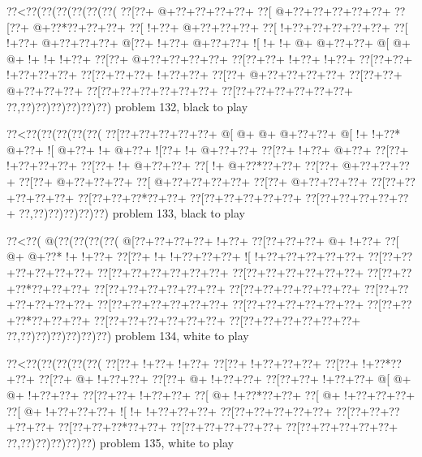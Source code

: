 \vbox{\vbox{\goo
\0??<\0??(\0??(\0??(\0??(\0??(\0??(
\0??[\0??+\- @+\0??+\0??+\0??+\0??+
\0??[\- @+\0??+\0??+\0??+\0??+\0??+
\0??[\0??+\- @+\0??*\0??+\0??+\0??+
\0??[\- !+\0??+\- @+\0??+\0??+\0??+
\0??[\- !+\0??+\0??+\0??+\0??+\0??+
\0??[\- !+\0??+\- @+\0??+\0??+\0??+
\- @[\0??+\- !+\0??+\- @+\0??+\0??+
\- ![\- !+\- !+\- @+\- @+\0??+\0??+
\- @[\- @+\- @+\- !+\- !+\- !+\0??+
\0??[\0??+\- @+\0??+\0??+\0??+\0??+
\0??[\0??+\0??+\- !+\0??+\- !+\0??+
\0??[\0??+\0??+\- !+\0??+\0??+\0??+
\0??[\0??+\0??+\0??+\- !+\0??+\0??+
\0??[\0??+\- @+\0??+\0??+\0??+\0??+
\0??[\0??+\0??+\- @+\0??+\0??+\0??+
\0??[\0??+\0??+\0??+\0??+\0??+\0??+
\0??[\0??+\0??+\0??+\0??+\0??+\0??+
\0??,\0??)\0??)\0??)\0??)\0??)\0??)
}
\hfil problem 132, black to play\hfil\break
}

\vbox{\vbox{\goo
\0??<\0??(\0??(\0??(\0??(\0??(
\0??[\0??+\0??+\0??+\0??+\0??+
\- @[\- @+\- @+\- @+\0??+\0??+
\- @[\- !+\- !+\0??*\- @+\0??+
\- ![\- @+\0??+\- !+\- @+\0??+
\- ![\0??+\- !+\- @+\0??+\0??+
\0??[\0??+\- !+\0??+\- @+\0??+
\0??[\0??+\- !+\0??+\0??+\0??+
\0??[\0??+\- !+\- @+\0??+\0??+
\0??[\- !+\- @+\0??*\0??+\0??+
\0??[\0??+\- @+\0??+\0??+\0??+
\0??[\0??+\- @+\0??+\0??+\0??+
\0??[\- @+\0??+\0??+\0??+\0??+
\0??[\0??+\- @+\0??+\0??+\0??+
\0??[\0??+\0??+\0??+\0??+\0??+
\0??[\0??+\0??+\0??*\0??+\0??+
\0??[\0??+\0??+\0??+\0??+\0??+
\0??[\0??+\0??+\0??+\0??+\0??+
\0??,\0??)\0??)\0??)\0??)\0??)
}
\hfil problem 133, black to play\hfil\break
}

\vbox{\vbox{\goo
\0??<\0??(\- @(\0??(\0??(\0??(\0??(
\- @[\0??+\0??+\0??+\0??+\- !+\0??+
\0??[\0??+\0??+\0??+\- @+\- !+\0??+
\0??[\- @+\- @+\0??*\- !+\- !+\0??+
\0??[\0??+\- !+\- !+\0??+\0??+\0??+
\- ![\- !+\0??+\0??+\0??+\0??+\0??+
\0??[\0??+\0??+\0??+\0??+\0??+\0??+
\0??[\0??+\0??+\0??+\0??+\0??+\0??+
\0??[\0??+\0??+\0??+\0??+\0??+\0??+
\0??[\0??+\0??+\0??*\0??+\0??+\0??+
\0??[\0??+\0??+\0??+\0??+\0??+\0??+
\0??[\0??+\0??+\0??+\0??+\0??+\0??+
\0??[\0??+\0??+\0??+\0??+\0??+\0??+
\0??[\0??+\0??+\0??+\0??+\0??+\0??+
\0??[\0??+\0??+\0??+\0??+\0??+\0??+
\0??[\0??+\0??+\0??*\0??+\0??+\0??+
\0??[\0??+\0??+\0??+\0??+\0??+\0??+
\0??[\0??+\0??+\0??+\0??+\0??+\0??+
\0??,\0??)\0??)\0??)\0??)\0??)\0??)
}
\hfil problem 134, white to play\hfil\break
}

\vbox{\vbox{\goo
\0??<\0??(\0??(\0??(\0??(\0??(
\0??[\0??+\- !+\0??+\- !+\0??+
\0??[\0??+\- !+\0??+\0??+\0??+
\0??[\0??+\- !+\0??*\0??+\0??+
\0??[\0??+\- @+\- !+\0??+\0??+
\0??[\0??+\- @+\- !+\0??+\0??+
\0??[\0??+\0??+\- !+\0??+\0??+
\- @[\- @+\- @+\- !+\0??+\0??+
\0??[\0??+\0??+\- !+\0??+\0??+
\0??[\- @+\- !+\0??*\0??+\0??+
\0??[\- @+\- !+\0??+\0??+\0??+
\0??[\- @+\- !+\0??+\0??+\0??+
\- ![\- !+\- !+\0??+\0??+\0??+
\0??[\0??+\0??+\0??+\0??+\0??+
\0??[\0??+\0??+\0??+\0??+\0??+
\0??[\0??+\0??+\0??*\0??+\0??+
\0??[\0??+\0??+\0??+\0??+\0??+
\0??[\0??+\0??+\0??+\0??+\0??+
\0??,\0??)\0??)\0??)\0??)\0??)
}
\hfil problem 135, white to play\hfil\break
}

